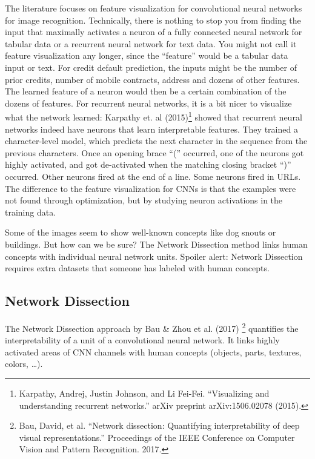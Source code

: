 \documentclass[12pt,]{krantz}
\begin{document}
The literature focuses on feature visualization for convolutional neural
networks for image recognition. Technically, there is nothing to stop
you from finding the input that maximally activates a neuron of a fully
connected neural network for tabular data or a recurrent neural network
for text data. You might not call it feature visualization any longer,
since the ``feature'' would be a tabular data input or text. For credit
default prediction, the inputs might be the number of prior credits,
number of mobile contracts, address and dozens of other features. The
learned feature of a neuron would then be a certain combination of the
dozens of features. For recurrent neural networks, it is a bit nicer to
visualize what the network learned: Karpathy et. al (2015)\footnote{Karpathy,
  Andrej, Justin Johnson, and Li Fei-Fei. ``Visualizing and
  understanding recurrent networks.'' arXiv preprint arXiv:1506.02078
  (2015).} showed that recurrent neural networks indeed have neurons
that learn interpretable features. They trained a character-level model,
which predicts the next character in the sequence from the previous
characters. Once an opening brace ``('' occurred, one of the neurons got
highly activated, and got de-activated when the matching closing bracket
``)'' occurred. Other neurons fired at the end of a line. Some neurons
fired in URLs. The difference to the feature visualization for CNNs is
that the examples were not found through optimization, but by studying
neuron activations in the training data.

Some of the images seem to show well-known concepts like dog snouts or
buildings. But how can we be sure? The Network Dissection method links
human concepts with individual neural network units. Spoiler alert:
Network Dissection requires extra datasets that someone has labeled with
human concepts.

\hypertarget{network-dissection}{\subsection{Network
Dissection}\label{network-dissection}}

The Network Dissection approach by Bau \& Zhou et al. (2017) \footnote{Bau,
  David, et al. ``Network dissection: Quantifying interpretability of
  deep visual representations.'' Proceedings of the IEEE Conference on
  Computer Vision and Pattern Recognition. 2017.} quantifies the
interpretability of a unit of a convolutional neural network. It links
highly activated areas of CNN channels with human concepts (objects,
parts, textures, colors, \ldots{}).
\end{document}
